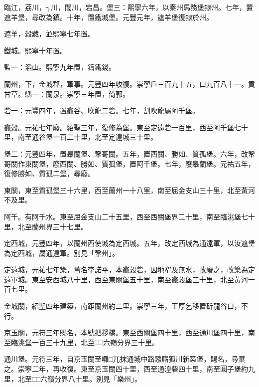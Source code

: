 \begin{pinyinscope}
 臨江，荔川，┐川，閭川，宕昌。堡三：熙寧六年，以秦州馬務堡隸州。七年，置遮羊堡，尋改為鎮。十年，置鐵城堡。元豐元年，遮羊堡復隸於州。



 遮羊，穀藏，並熙寧七年置。



 鐵城。熙寧十年置。



 監一：滔山。熙寧九年置，鑄鐵錢。



 蘭州，下，金城郡，軍事。元豐四年收復。崇寧戶三百九十五，口九百八十一。貢甘草。縣一：蘭泉。崇寧三年置，倚郭。



 砦一：元豐四年，置龕谷、吹龍二砦。七年，割吹龍屬阿千堡。



 龕穀。元祐七年廢。紹聖三年，復修為堡。東至定遠砦一百里，西至阿千堡七十里，南至通谷堡一百二十里，北至定遠城三十里。



 堡二：元豐四年，置皋蘭堡、鞏哥關。五年，置西關、勝如、質孤堡。六年，改鞏哥關作東關堡，廢西關、勝如、質孤堡，置阿千堡。七年，廢皋蘭堡。元祐五年，復修勝如、質孤二堡，尋廢。



 東關，東至質孤堡三十六里，西至蘭州一十八里，南至屈金支山三十里，北至黃河不及里。



 阿千。有阿千水。東至屈金支山二十五里，西至西關堡界二十里，南至臨洮堡七十
 里，北至蘭州界三十七里。



 定西城，元豐四年，以蘭州西使城為定西城。五年，改定西城為通遠軍，以汝遮堡為定西城，屬通遠軍。別見「鞏州」。



 定遠城，元祐七年築，舊名李諾平，本龕穀砦，因地窄及無水，故廢之，改築為定遠軍城。東至安西城八十里，西至東關堡五十里，南至龕穀堡三十里，北至黃河一百七里。



 金城關，紹聖四年建築，南距蘭州約二里。崇寧三年，王厚乞移置斫龍谷口，不行。



 京玉關，元符三年賜名，本號把拶橋。東至西關堡四十里，西至通川堡四十里，南至臨洮堡一百三十九里，北至□□六嶺分界三十里。



 通川堡。元符三年，自京玉關至囉□兀抹通城中路鏹廝狐川新築堡，賜名，尋棄之。崇寧二年，再收復。東至京玉關四十里，西至通湟砦四十里，南至圓子堡約九里，北至□□六嶺分界八十里。別見「樂州」。




\end{pinyinscope}
